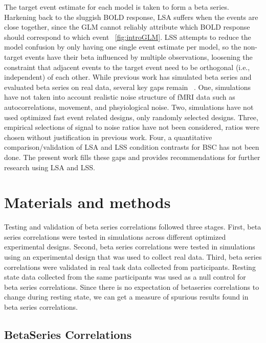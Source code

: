 \documentclass[10pt,letterpaper]{article}
\begin{document}
The target event estimate for each model is taken to form a beta series.
Harkening back to the sluggish BOLD response, LSA suffers when the events are close together,
since the GLM cannot reliably attribute which BOLD response should correspond to which event ~\ref{fig:introGLM}.
LSS attempts to reduce the model confusion by only having one single event estimate per model,
so the non-target events have their beta influenced by multiple observations, loosening the
constraint that adjacent events to the target event need to be orthogonal (i.e., independent) of each other.
While previous work has simulated beta series and evaluated beta series on real data,
several key gaps remain ~\cite{Mumford2014a,Mumford2012,Turner2012a,Abdulrahman2016,Cisler2012,Arco2018}.
One, simulations have not taken into account realistic noise structure of fMRI data such as autocorrelations, movement, and phsyiological noise.
Two, simulations have not used optimized fast event related designs, only randomly selected designs. 
Three, empirical selections of signal to noise ratios have not been considered,
ratios were chosen without justification in previous work.
Four, a quantitative comparison/validation of LSA and LSS condition contrasts for BSC has not been done.
The present work fills these gaps and provides recommendations for further research
using LSA and LSS.


\section*{Materials and methods}
\label{methods}

Testing and validation of beta series correlations followed three stages.
First, beta series correlations were tested in simulations across different
optimized experimental designs.
Second, beta series correlations were tested in simulations using an experimental
design that was used to collect real data.
Third, beta series correlations were validated in real task data collected from
participants.
Resting state data collected from the same participants was used as a null
control for beta series correlations.
Since there is no expectation of betaseries correlations to change
during resting state, we can get a measure of spurious results found
in beta series correlations.

\subsection*{BetaSeries Correlations}
\label{methods:bsc}
\end{document}
